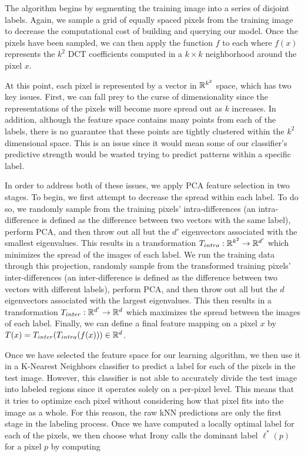 The algorithm begins by segmenting the training image into a series of disjoint labels.  Again, we sample a grid of equally spaced pixels from the training image to decrease the computational cost of building and querying our model.  Once the pixels have been sampled, we can then apply the function $f$ to each where $f(x)$ represents the $k^2$ DCT coefficients computed in a $k \times k$ neighborhood around the pixel $x$.

At this point, each pixel is represented by a vector in $\mathbb{R}^{k^2}$ space, which has two key issues.  First, we can fall prey to the curse of dimensionality since the representations of the pixels will become more spread out as $k$ increases.  In addition, although the feature space contains many points from each of the labels, there is no guarantee that these points are tightly clustered within the $k^2$ dimensional space.  This is an issue since it would mean some of our classifier's predictive strength would be wasted trying to predict patterns within a specific label.

In order to address both of these issues, we apply PCA feature selection in two stages.  To begin, we first attempt to decrease the spread within each label.  To do so, we randomly sample from the training pixels' intra-differences (an intra-difference is defined as the difference between two vectors with the same label), perform PCA, and then throw out all but the $d'$ eigenvectors associated with the smallest eigenvalues.  This results in a transformation $T_{intra} : \mathbb{R}^{k^2} \rightarrow \mathbb{R}^{d'}$ which minimizes the spread of the images of each label.  We run the training data through this projection, randomly sample from the transformed training pixels' inter-differences (an inter-difference is defined as the difference between two vectors with different labels), perform PCA, and then throw out all but the $d$ eigenvectors associated with the largest eigenvalues.  This then results in a transformation $T_{inter} : \mathbb{R}^{d'} \rightarrow \mathbb{R}^d$ which maximizes the spread between the images of each label.  Finally, we can define a final feature mapping on a pixel $x$ by $T(x) = T_{inter}(T_{intra}(f(x))) \in \mathbb{R}^d$.

Once we have selected the feature space for our learning algorithm, we then use it in a K-Nearest Neighbors classifier to predict a label for each of the pixels in the test image.  However, this classifier is not able to accurately divide the test image into labeled regions since it operates solely on a per-pixel level.  This means that it tries to optimize each pixel without considering how that pixel fits into the image as a whole.  For this reason, the raw kNN predictions are only the first stage in the labeling process.  Once we have computed a locally optimal label for each of the pixels, we then choose what Irony calls the dominant label $\ell^*(p)$ for a pixel $p$ by computing

